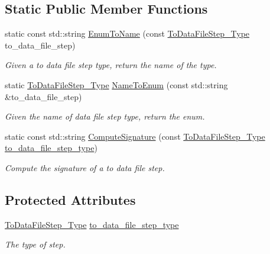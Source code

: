 \subsection*{Static Public Member Functions}
\begin{DoxyCompactItemize}
\item 
static const std\+::string \hyperlink{classToDataFileStep_a6404e3b2da6df6092e064f5d462186d4}{Enum\+To\+Name} (const \hyperlink{to__data__file__step_8hpp_a11e82da7dd30bcde03a139fc0baa4f38}{To\+Data\+File\+Step\+\_\+\+Type} to\+\_\+data\+\_\+file\+\_\+step)
\begin{DoxyCompactList}\small\item\em Given a to data file step type, return the name of the type. \end{DoxyCompactList}\item 
static \hyperlink{to__data__file__step_8hpp_a11e82da7dd30bcde03a139fc0baa4f38}{To\+Data\+File\+Step\+\_\+\+Type} \hyperlink{classToDataFileStep_a9cca166c6c49eeb41239edfe3669abf9}{Name\+To\+Enum} (const std\+::string \&to\+\_\+data\+\_\+file\+\_\+step)
\begin{DoxyCompactList}\small\item\em Given the name of data file step type, return the enum. \end{DoxyCompactList}\item 
static const std\+::string \hyperlink{classToDataFileStep_a0e5c20720eaf49db1a8a1e82c00d43f7}{Compute\+Signature} (const \hyperlink{to__data__file__step_8hpp_a11e82da7dd30bcde03a139fc0baa4f38}{To\+Data\+File\+Step\+\_\+\+Type} \hyperlink{classToDataFileStep_aa9fb3dead3ab5f8405542d47b654ad32}{to\+\_\+data\+\_\+file\+\_\+step\+\_\+type})
\begin{DoxyCompactList}\small\item\em Compute the signature of a to data file step. \end{DoxyCompactList}\end{DoxyCompactItemize}
\subsection*{Protected Attributes}
\begin{DoxyCompactItemize}
\item 
\hyperlink{to__data__file__step_8hpp_a11e82da7dd30bcde03a139fc0baa4f38}{To\+Data\+File\+Step\+\_\+\+Type} \hyperlink{classToDataFileStep_aa9fb3dead3ab5f8405542d47b654ad32}{to\+\_\+data\+\_\+file\+\_\+step\+\_\+type}
\begin{DoxyCompactList}\small\item\em The type of step. \end{DoxyCompactList}\end{DoxyCompactItemize}
